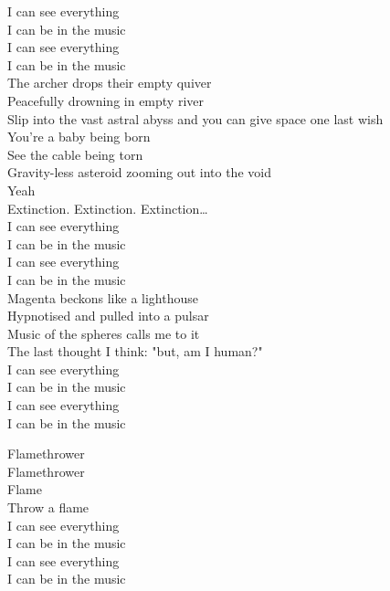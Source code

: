 I can see everything \\
I can be in the music \\
I can see everything \\
I can be in the music \\

The archer drops their empty quiver \\
Peacefully drowning in empty river \\
Slip into the vast astral abyss and you can give space one last wish \\

You're a baby being born \\
See the cable being torn \\
Gravity-less asteroid zooming out into the void \\
Yeah \\

Extinction. Extinction. Extinction… \\

I can see everything \\
I can be in the music \\
I can see everything \\
I can be in the music \\

Magenta beckons like a lighthouse \\
Hypnotised and pulled into a pulsar \\
Music of the spheres calls me to it \\
The last thought I think: "but, am I human?" \\

I can see everything \\
I can be in the music \\
I can see everything \\
I can be in the music \\


Flamethrower \\
Flamethrower \\
Flame \\
Throw a flame \\

I can see everything \\
I can be in the music \\
I can see everything \\
I can be in the music \\

